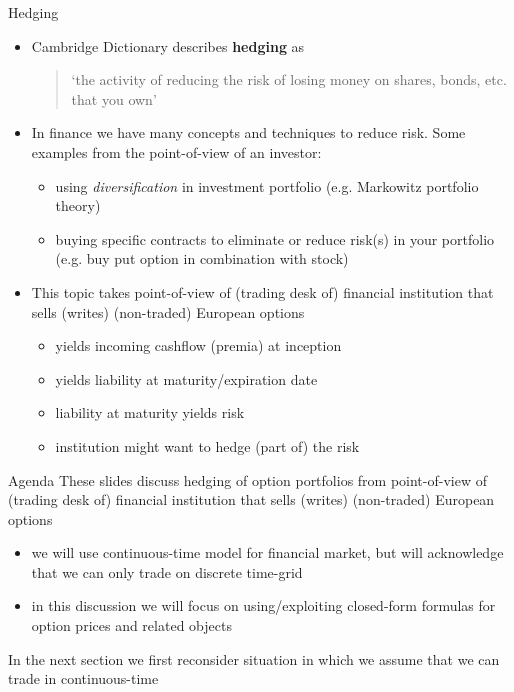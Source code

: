 \documentclass[pdf, handout]{beamer}
\begin{document}
\begin{frame}{Hedging}
\begin{itemize}
\item Cambridge Dictionary describes \textbf{hedging}  as
\begin{quote}
`the activity of reducing the risk of losing money on shares, bonds, etc. that you own'
\end{quote}
\item In finance we have many concepts and techniques to reduce risk. Some examples from the point-of-view of an investor:
\begin{itemize}
\item using \emph{diversification}  in investment portfolio  (e.g. Markowitz portfolio theory)
\item buying specific contracts to eliminate or reduce risk(s)
in your portfolio
(e.g. buy put option in combination with stock)
\end{itemize}
\item This topic takes point-of-view 
of (trading desk of)  financial institution that sells (writes)
(non-traded) European
options 
\begin{itemize}
\item yields incoming cashflow (premia) at inception
\item yields liability at maturity/expiration date
\item liability at maturity yields risk
\item institution might want to hedge (part of) the risk
\end{itemize}
\end{itemize}
\end{frame}





\begin{frame}{Agenda}
These slides discuss hedging of option portfolios from
point-of-view
of (trading desk of) financial institution
that sells (writes)
(non-traded) European
options 
\begin{itemize}
\item we will use continuous-time model for financial market, but will acknowledge that we can only trade on discrete time-grid 
\item in this discussion we will focus on using/exploiting closed-form formulas for
option prices and related objects
\end{itemize}
In the next section we first reconsider situation
in which  we assume that we can trade in continuous-time
\end{frame}
\end{document}
